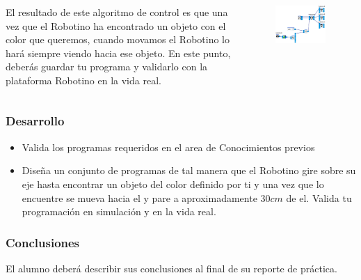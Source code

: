 \begin{frame}
	\begin{columns}
		El resultado de este algoritmo de control es que una vez que el Robotino ha encontrado un objeto con el color que queremos, cuando movamos el Robotino lo hará siempre viendo hacia ese objeto. En este punto, deberás guardar tu programa y validarlo con la plataforma Robotino en la vida real.

		\begin{figure}
			\begin{center}
				\includegraphics[width=0.95\textwidth]{images/01-vision-artificial/12.png}
			\end{center}
		\end{figure}
	\end{columns}
\end{frame}
\begin{frame}
	\frametitle{Desarrollo}

	\begin{itemize}
		\item Valida los programas requeridos en el area de Conocimientos previos
		\item Diseña un conjunto de programas de tal manera que el Robotino gire sobre su eje hasta encontrar un objeto del color definido por ti y una vez que lo encuentre se mueva hacia el y pare a aproximadamente $30cm$ de el. Valida tu programación en simulación y en la vida real.
	\end{itemize}
\end{frame}
\begin{frame}
	\frametitle{Conclusiones}
	El alumno deberá describir sus conclusiones al final de su reporte de práctica.
\end{frame}

